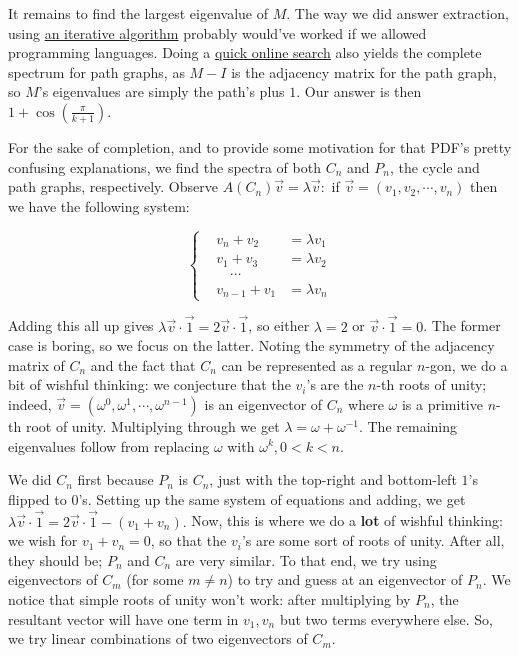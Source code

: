 \begin{solution}
    It remains to find the largest eigenvalue of $M$. The way we did answer extraction, using 
    \href{https://en.wikipedia.org/wiki/Rayleigh_quotient_iteration}{an iterative algorithm} 
    probably would've worked if we allowed programming languages. Doing a \href{https://www.win.tue.nl/~aeb/2WF02/spectra.pdf}{quick online search} 
    also yields the complete spectrum for path graphs, as $M - I$ is the adjacency matrix for 
    the path graph, so $M$'s eigenvalues are simply the path's plus $1$. Our answer is then 
    $\boxed{1 + \cos\left(\frac{\pi}{k + 1}\right)}$. \medskip

    For the sake of completion, and to provide some motivation for that PDF's pretty confusing explanations, 
    we find the spectra of both $C_n$ and $P_n$, the cycle and path graphs, respectively. 
    Observe $A\left(C_n\right)\vec v = \lambda\vec v:$ if $\vec v = \left(v_1, v_2, \cdots , v_n\right)$ 
    then we have the following system: 

    $$\left\{ \begin{aligned}
        &v_n + v_2 &= \lambda v_1 \\
        &v_1 + v_3 &= \lambda v_2 \\ 
        &\quad\cdots \\
        &v_{n - 1} + v_1 &= \lambda v_n
    \end{aligned} \right.$$

    Adding this all up gives $\lambda \vec v \cdot \vec 1 = 2\vec v \cdot \vec 1$, so either 
    $\lambda = 2$ or $\vec v \cdot \vec 1 = 0$. The former case is boring, so we focus on 
    the latter. Noting the symmetry of the adjacency matrix of $C_n$ and the fact that $C_n$ 
    can be represented as a regular $n$-gon, we do a bit of wishful thinking: we conjecture 
    that the $v_i$'s are the $n$-th 
    roots of unity; indeed, $\vec v = \left(\omega^0, \omega^1, \cdots , \omega^{n - 1}\right)$ 
    is an eigenvector of $C_n$ where $\omega$ is a primitive $n$-th root of unity. Multiplying 
    through we get $\lambda = \omega + \omega^{-1}$. The remaining eigenvalues follow from 
    replacing $\omega$ with $\omega^k, 0 < k < n$. \medskip

    We did $C_n$ first because $P_n$ is $C_n$, just with the top-right and bottom-left $1$'s 
    flipped to $0$'s. Setting up the same system of equations and adding, we get 
    $\lambda\vec v \cdot \vec 1 = 2\vec v \cdot \vec 1 - \left(v_1 + v_n\right).$ Now, this is 
    where we do a \textbf{lot} of wishful thinking: we wish for $v_1 + v_n = 0$, so that the $v_i$'s are 
    some sort of roots of unity. After all, they should be; $P_n$ and $C_n$ are very similar. 
    To that end, we try using eigenvectors of $C_m$ (for some $m \neq n$) to try and guess at 
    an eigenvector of $P_n$. We notice that simple roots of unity won't work: after multiplying 
    by $P_n$, the resultant vector will have one term in $v_1, v_n$ but two terms everywhere else. 
    So, we try linear combinations of two eigenvectors of $C_m$. \medskip
    

\end{solution}
